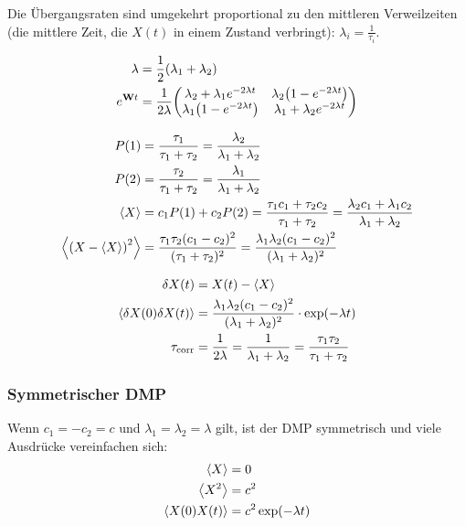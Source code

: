 \documentclass[main.tex]{subfiles}
\begin{document}
Die Übergangsraten sind umgekehrt proportional zu den mittleren Verweilzeiten
(die mittlere Zeit, die \(X(t)\) in einem Zustand verbringt): \(\lambda_i =
\frac{1}{\tau_i}\).

\begin{align}
	\lambda &= \frac{1}{2} \qty(\lambda_1 + \lambda_2)\\
	e^{\mathbf{W}t} &= \frac{1}{2\lambda} \mqty(\lambda_2 + \lambda_1 e^{-2\lambda t} & \lambda_2 \qty(1- e^{-2\lambda t})\\
	\lambda_1 \qty(1- e^{-2\lambda t}) & \lambda_1 + \lambda_2 e^{-2\lambda t})
\end{align}

\begin{align}
	P(1)                            & = \frac{\tau_1}{\tau_1 + \tau_2} =
	\frac{\lambda_2 }{\lambda_1 +
		\lambda_2}
	\\
	P(2)                            & = \frac{\tau_2}{\tau_1 + \tau_2} =
	\frac{\lambda_1 }{\lambda_1 +
		\lambda_2}
	\\
	\expval{X}                      & = c_1 P(1) + c_2 P(2) = \frac{\tau_1
		c_1 + \tau_2
		c_2}{\tau_1 + \tau_2} = \frac{\lambda_2 c_1 + \lambda_1
		c_2}{\lambda_1 +
		\lambda_2}
	\\
	\expval{\qty(X - \expval{X})^2} & = \frac{\tau_1 \tau_2
		(c_1-c_2)^2}{(\tau_1 + \tau_2)^2} = \frac{\lambda_1 \lambda_2
		(c_1-c_2)^2}{(\lambda_1 + \lambda_2)^2}
\end{align}

\begin{align}
	\delta X(t) & = X(t) - \expval{X}\\
	\expval{\delta X(0)\delta X(t)} &= \frac{\lambda_1 \lambda_2
	(c_1-c_2)^2}{(\lambda_1 + \lambda_2)^2} \cdot \exp(-\lambda t)\\
	\tau_\mathrm{corr} &= \frac{1}{2\lambda} = \frac{1}{\lambda_1 +
		\lambda_2} = \frac{\tau_1 \tau_2}{\tau_1 + \tau_2}
\end{align}

\subsubsection*{Symmetrischer DMP}

Wenn \(c_1=-c_2=c\) und \(\lambda_1 = \lambda_2 = \lambda\) gilt, ist der DMP
symmetrisch und viele Ausdrücke vereinfachen sich:
\begin{align}
	\expval{X}        & = 0                    \\
	\expval{X^2}      & = c^2                  \\
	\expval{X(0)X(t)} & = c^2 \exp(-\lambda t)
\end{align}\cite{matphys}
\end{document}
